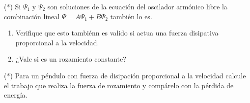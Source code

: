 \item (*) Si \(\Psi_1\) y \(\Psi_2\) son soluciones de la ecuación del oscilador armónico libre la combinación lineal \(\Psi = A \Psi_1 + B \Psi_2\) también lo es.
\begin{enumerate}
	\item Verifique que esto tambiénn es valido si actua una fuerza disipativa proporcional a la velocidad.
	\item ¿Vale si es un rozamiento constante?
\end{enumerate}

\item (*) Para un péndulo con fuerza de disipación proporcional a la velocidad calcule el trabajo que realiza la fuerza de rozamiento y compárelo con la pérdida de energía.

